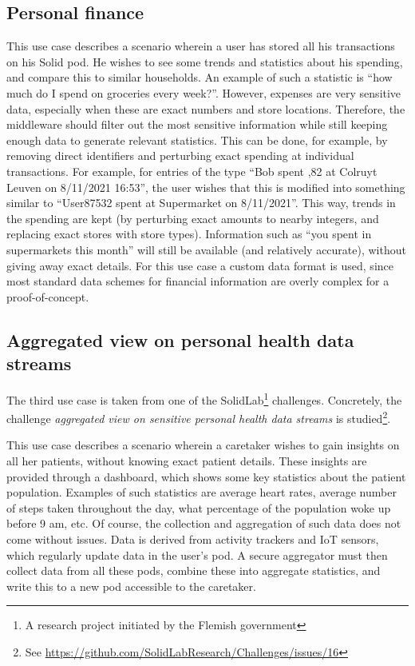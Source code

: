 \subsection{Personal finance}
\label{usecase:personal-finance}
This use case describes a scenario wherein a user has stored all his transactions on his Solid pod. He wishes to see some trends and statistics about his spending, and compare this to similar households. An example of such a statistic is ``how much do I spend on groceries every week?''.  However, expenses are very sensitive data, especially when these are exact numbers and store locations. Therefore, the middleware should filter out the most sensitive information while still keeping enough data to generate relevant statistics. This can be done, for example, by removing direct identifiers and perturbing exact spending at individual transactions. For example, for entries of the type ``Bob spent ,82 at Colruyt Leuven on 8/11/2021 16:53'', the user wishes that this is modified into something similar to ``User87532 spent  at Supermarket on 8/11/2021''. This way, trends in the spending are kept (by perturbing exact amounts to nearby integers, and replacing exact stores with store types). Information such as ``you spent  in supermarkets this month'' will still be available (and relatively accurate), without giving away exact details. For this use case a custom data format is used, since most standard data schemes for financial information are overly complex for a proof-of-concept.

\subsection{Aggregated view on personal health data streams}
The third use case is taken from one of the SolidLab\footnote{A research project initiated by the Flemish government } challenges. Concretely, the challenge \textit{aggregated view on sensitive personal health data streams} is studied\footnote{See \url{https://github.com/SolidLabResearch/Challenges/issues/16}}.

This use case describes a scenario wherein a caretaker wishes to gain insights on all her patients, without knowing exact patient details. These insights are provided through a dashboard, which shows some key statistics about the patient population. Examples of such statistics are average heart rates, average number of steps taken throughout the day, what percentage of the population woke up before 9 am, etc. Of course, the collection and aggregation of such data does not come without issues. Data is derived from activity trackers and IoT sensors, which regularly update data in the user's pod. A secure aggregator must then collect data from all these pods, combine these into aggregate statistics, and write this to a new pod accessible to the caretaker.

